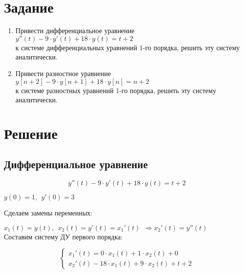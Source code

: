 




\section{Задание}

\begin{enumerate}

\item Привести дифференциальное уравнение\\ $y''(t) - 9 \cdot y'(t) + 18 \cdot y(t) = t + 2$\\ к системе дифференциальных уравнений 1-го порядка, решить эту систему аналитически.

\item Привести разностное уравнение\\ $y[n+2] - 9 \cdot y[n+1] + 18 \cdot y[n] = n + 2$\\ к системе разностных уравнений 1-го порядка, решить эту систему аналитически.

\end{enumerate}

\section{Решение}

\subsection{Дифференциальное уравнение}

\begin{displaymath}
y''(t) - 9 \cdot y'(t) + 18 \cdot y(t) = t + 2
\end{displaymath}
\begin{center}
$y(0) = 1,\ \ y'(0) = 3$
\end{center}

Сделаем замены переменных:

$x_1(t) = y(t),\ \ x_2(t) = y'(t) = x_1'(t) \ \ \Rightarrow x_2'(t) = y''(t)$\\[1mm]

Составим систему ДУ первого порядка:

\begin{displaymath}
\begin{cases}
x_1'(t) = 0 \cdot x_1(t) + 1 \cdot x_2(t) + 0
\\
x_2'(t) - 18 \cdot x_1(t) + 9 \cdot x_2(t) + t + 2
\end{cases}
\end{displaymath}


